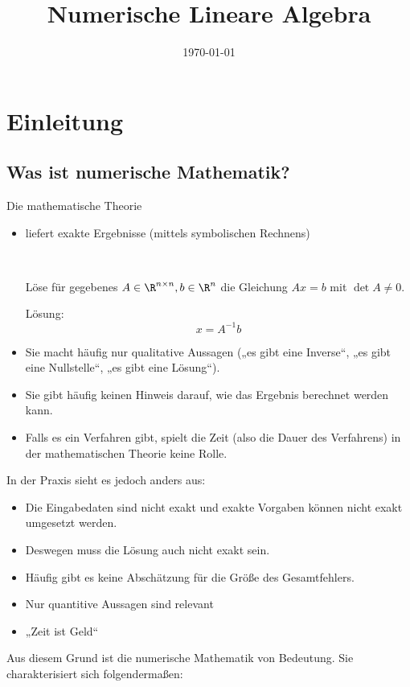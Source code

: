 \documentclass[a4paper]{scrartcl}
\title{Numerische Lineare Algebra}
\date{\today}
\numberwithin{equation}{section}
\begin{document}
\maketitle
\tableofcontents

\section{Einleitung}

\subsection{Was ist numerische Mathematik?}

Die mathematische Theorie
\begin{itemize}
\item liefert exakte Ergebnisse (mittels symbolischen Rechnens)
	\begin{ex*}~

		Löse für gegebenes $A\in \R^{n\times n}, b\in \R^n$ die Gleichung $Ax=b$ mit $\det A \neq 0$.

		Lösung:
		\[
			x=A^{-1}b
		\]
	\end{ex*}
\item Sie macht häufig nur qualitative Aussagen 
	(„es gibt eine Inverse“, „es gibt eine Nullstelle“, „es gibt eine Lösung“).
\item Sie gibt häufig keinen Hinweis darauf, wie das Ergebnis berechnet werden kann.
\item Falls es ein Verfahren gibt, spielt die Zeit (also die Dauer des Verfahrens) in der mathematischen Theorie keine Rolle.
\end{itemize}
In der Praxis sieht es jedoch anders aus:
\begin{itemize}
\item Die Eingabedaten sind nicht exakt und exakte Vorgaben können nicht exakt umgesetzt werden.
\item Deswegen muss die Lösung auch nicht exakt sein.
\item Häufig gibt es keine Abschätzung für die Größe des Gesamtfehlers.
\item Nur quantitive Aussagen sind relevant
\item „Zeit ist Geld“
\end{itemize}
Aus diesem Grund ist die numerische Mathematik von Bedeutung.
Sie charakterisiert sich folgendermaßen:
\end{document}
